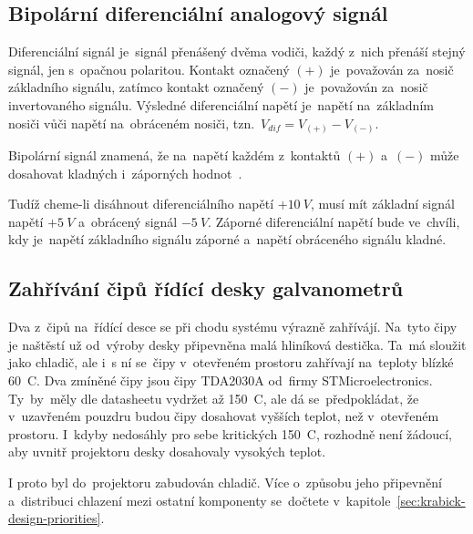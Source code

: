 \subsection{Bipolární diferenciální analogový signál}
Diferenciální signál je~signál přenášený dvěma vodiči, každý z~nich přenáší stejný signál, jen s~opačnou polaritou. Kontakt označený $(+)$ je~považován za~nosič základního signálu, zatímco kontakt označený $(-)$ je~považován za~nosič invertovaného signálu. Výsledné diferenciální napětí je~napětí na~základním nosiči vůči napětí na~obráceném nosiči, tzn.~$V_{dif} = V_{(+)} - V_{(-)}$.~\cite{ilda-signal-spec}

Bipolární signál znamená, že na~napětí každém z~kontaktů $(+)$ a~$(-)$ může dosahovat kladných i~záporných hodnot~\cite{ilda-signal-spec}.

Tudíž cheme-li disáhnout diferenciálního napětí $+10~V$, musí mít základní signál napětí $+5~V$ a~obrácený signál $-5~V$. Záporné diferenciální napětí bude ve~chvíli, kdy je~napětí základního signálu záporné a~napětí obráceného signálu kladné.

\subsection{Zahřívání čipů řídící desky galvanometrů} \label{sec:galvoboard-chips-heating-up}
Dva z~čipů na~řídící desce se při chodu systému výrazně zahřívájí. Na~tyto čipy je naštěstí už od~výroby desky připevněna malá hliníková destička. Ta~má sloužit jako chladič, ale i~s ní se~čipy v~otevřeném prostoru zahřívají na~teploty blízké 60~\degree{}C.
Dva zmíněné čipy jsou čipy TDA2030A od~firmy STMicroelectronics. Ty~by~měly dle datasheetu vydržet až 150~\degree{}C, ale dá se~předpokládat, že v~uzavřeném pouzdru budou čipy dosahovat vyšších teplot, než v~otevřeném prostoru. I~kdyby nedosáhly pro sebe kritických 150~\degree{}C, rozhodně není žádoucí, aby uvnitř projektoru desky dosahovaly vysokých teplot.

I proto byl do~projektoru zabudován chladič. Více o~způsobu jeho připevnění a~distribuci chlazení mezi ostatní komponenty se~dočtete v~kapitole~\ref{sec:krabick-design-priorities}.
